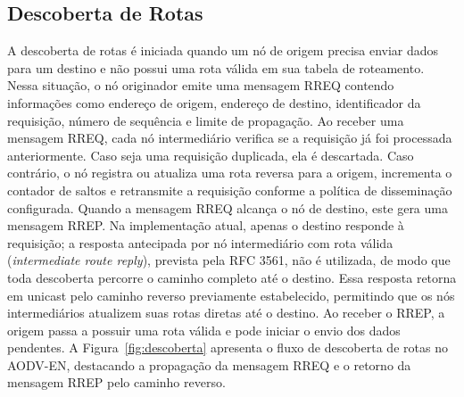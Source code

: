 \subsection{Descoberta de Rotas}\label{descoberta-de-rotas}

A descoberta de rotas é iniciada quando um nó de
origem precisa enviar dados para um destino e não possui uma rota válida
em sua tabela de roteamento. Nessa situação, o nó originador emite uma
mensagem RREQ contendo informações como endereço de origem, endereço de
destino, identificador da requisição, número de sequência e limite de
propagação. Ao receber uma mensagem RREQ, cada nó intermediário verifica
se a requisição já foi processada anteriormente. Caso seja uma
requisição duplicada, ela é descartada. Caso contrário, o nó registra ou
atualiza uma rota reversa para a origem, incrementa o contador de saltos
e retransmite a requisição conforme a política de disseminação
configurada. Quando a mensagem RREQ alcança o nó de destino, este gera
uma mensagem RREP. Na implementação atual, apenas o destino responde à
requisição; a resposta antecipada por nó intermediário com rota válida
(\emph{intermediate route reply}), prevista pela RFC 3561, não é
utilizada, de modo que toda descoberta percorre o caminho completo até o
destino. Essa resposta retorna em unicast pelo caminho reverso previamente estabelecido,
permitindo que os nós intermediários atualizem suas rotas diretas até o
destino. Ao receber o RREP, a origem passa a possuir uma rota válida e
pode iniciar o envio dos dados pendentes. A Figura~\ref{fig:descoberta} apresenta o fluxo
de descoberta de rotas no AODV-EN, destacando a propagação da mensagem
RREQ e o retorno da mensagem RREP pelo caminho reverso.
